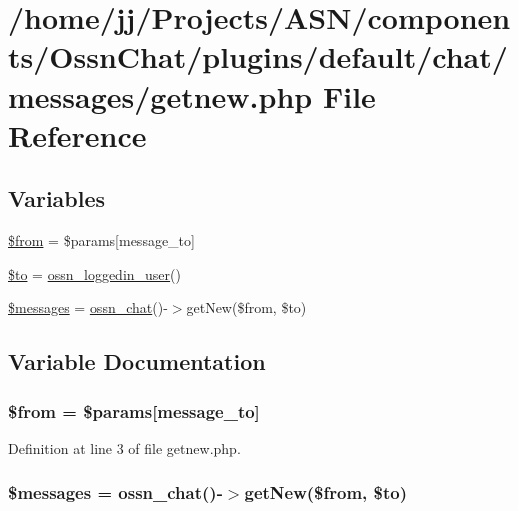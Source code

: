 \hypertarget{getnew_8php}{}\section{/home/jj/\+Projects/\+A\+S\+N/components/\+Ossn\+Chat/plugins/default/chat/messages/getnew.php File Reference}
\label{getnew_8php}
\subsection*{Variables}
\begin{DoxyCompactItemize}
\item 
\hyperlink{getnew_8php_a0bb7e2b3d541598cc9c9e3b11bee859c}{\$from} = \$params\mbox{[}\textquotesingle{}message\+\_\+to\textquotesingle{}\mbox{]}
\item 
\hyperlink{getnew_8php_ac19f839b525d6d99d063fe56bf2a6d3b}{\$to} = \hyperlink{ossn_8lib_8users_8php_aa3c8068d0e6638b414d6a2f6c62565b8}{ossn\+\_\+loggedin\+\_\+user}()
\item 
\hyperlink{getnew_8php_a21a183f927a6d243fe6b4ba3a6c4d4c8}{\$messages} = \hyperlink{ossn_8lib_8chat_8php_adfe2d47e3e6a6825beb8e3b9c8d4c6dd}{ossn\+\_\+chat}()-\/$>$get\+New(\$from, \$to)
\end{DoxyCompactItemize}


\subsection{Variable Documentation}
\subsubsection[{\texorpdfstring{\$from}{$from}}]{\setlength{\rightskip}{0pt plus 5cm}\$from = \$params\mbox{[}\textquotesingle{}message\+\_\+to\textquotesingle{}\mbox{]}}\hypertarget{getnew_8php_a0bb7e2b3d541598cc9c9e3b11bee859c}{}\label{getnew_8php_a0bb7e2b3d541598cc9c9e3b11bee859c}


Definition at line 3 of file getnew.\+php.

\subsubsection[{\texorpdfstring{\$messages}{$messages}}]{\setlength{\rightskip}{0pt plus 5cm}\$messages = {\bf ossn\+\_\+chat}()-\/$>$get\+New(\$from, \$to)}\hypertarget{getnew_8php_a21a183f927a6d243fe6b4ba3a6c4d4c8}{}\label{getnew_8php_a21a183f927a6d243fe6b4ba3a6c4d4c8}


